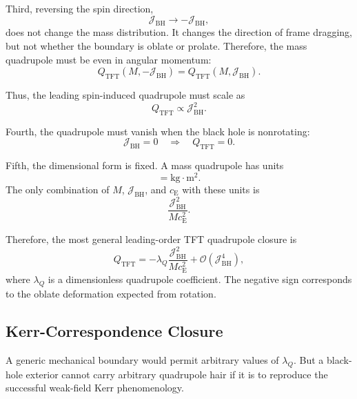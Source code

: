 Third, reversing the spin direction,
\begin{equation}
    \mathcal{J}_{\mathrm{BH}} \rightarrow -\mathcal{J}_{\mathrm{BH}},
\end{equation}
does not change the mass distribution. It changes the direction of frame dragging, but not whether the boundary is oblate or prolate. Therefore, the mass quadrupole must be even in angular momentum:
\begin{equation}
    Q_{\mathrm{TFT}}(M,-\mathcal{J}_{\mathrm{BH}}) = Q_{\mathrm{TFT}}(M,\mathcal{J}_{\mathrm{BH}}).
\end{equation}

Thus, the leading spin-induced quadrupole must scale as
\begin{equation}
    Q_{\mathrm{TFT}} \propto \mathcal{J}_{\mathrm{BH}}^2.
\end{equation}

Fourth, the quadrupole must vanish when the black hole is nonrotating:
\begin{equation}
    \mathcal{J}_{\mathrm{BH}}=0 \quad \Rightarrow \quad Q_{\mathrm{TFT}}=0.
\end{equation}

Fifth, the dimensional form is fixed. A mass quadrupole has units
\begin{equation}
    [Q] = \mathrm{kg}\cdot\mathrm{m^2}.
\end{equation}
The only combination of $M$, $\mathcal{J}_{\mathrm{BH}}$, and $c_{\mathrm{E}}$ with these units is
\begin{equation}
    \frac{\mathcal{J}_{\mathrm{BH}}^2}{M c_{\mathrm{E}}^2}.
\end{equation}

Therefore, the most general leading-order TFT quadrupole closure is
\begin{equation}
    Q_{\mathrm{TFT}} = -\lambda_Q \frac{\mathcal{J}_{\mathrm{BH}}^2}{M c_{\mathrm{E}}^2} + \mathcal{O}(\mathcal{J}_{\mathrm{BH}}^4),
\end{equation}
where $\lambda_Q$ is a dimensionless quadrupole coefficient. The negative sign corresponds to the oblate deformation expected from rotation.

\subsection{Kerr-Correspondence Closure}

A generic mechanical boundary would permit arbitrary values of $\lambda_Q$. But a black-hole exterior cannot carry arbitrary quadrupole hair if it is to reproduce the successful weak-field Kerr phenomenology.

